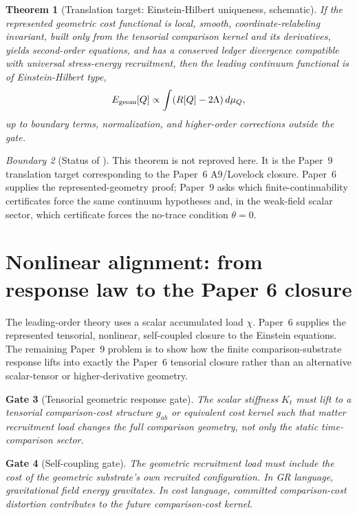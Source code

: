 \documentclass[11pt]{article}
\newtheorem{theorem}{Theorem}[section]
\newtheorem{gate}[theorem]{Gate}
\theoremstyle{remark}
\newtheorem{warning}[theorem]{Boundary}
\newcommand{\Egeom}{E_{\rm geom}}
\begin{document}
\begin{theorem}[Translation target: Einstein-Hilbert uniqueness, schematic]
\label{thm:target-eh}
If the represented geometric cost functional is local, smooth, coordinate-relabeling invariant, built only from the tensorial comparison kernel and its derivatives, yields second-order equations, and has a conserved ledger divergence compatible with universal stress-energy recruitment, then the leading continuum functional is of Einstein-Hilbert type,
\[
        \Egeom[Q]\propto \int (R[Q]-2\Lambda)\,d\mu_Q,
\]
up to boundary terms, normalization, and higher-order corrections outside the gate.
\end{theorem}

\begin{warning}[Status of ]
This theorem is not reproved here.  It is the Paper~9 translation target corresponding to the Paper~6 A9/Lovelock closure.  Paper~6 supplies the represented-geometry proof; Paper~9 asks which finite-continuability certificates force the same continuum hypotheses and, in the weak-field scalar sector, which certificate forces the no-trace condition \(\theta=0\).
\end{warning}

\section{Nonlinear alignment: from response law to the Paper 6 closure}

The leading-order theory uses a scalar accumulated load \(\chi\).  Paper~6 supplies the represented tensorial, nonlinear, self-coupled closure to the Einstein equations.  The remaining Paper~9 problem is to show how the finite comparison-substrate response lifts into exactly the Paper~6 tensorial closure rather than an alternative scalar-tensor or higher-derivative geometry.

\begin{gate}[Tensorial geometric response gate]
The scalar stiffness \(K_t\) must lift to a tensorial comparison-cost structure \(g_{ab}\) or equivalent cost kernel such that matter recruitment load changes the full comparison geometry, not only the static time-comparison sector.
\end{gate}

\begin{gate}[Self-coupling gate]
The geometric recruitment load must include the cost of the geometric substrate's own recruited configuration.  In GR language, gravitational field energy gravitates.  In cost language, committed comparison-cost distortion contributes to the future comparison-cost kernel.
\end{gate}
\end{document}
